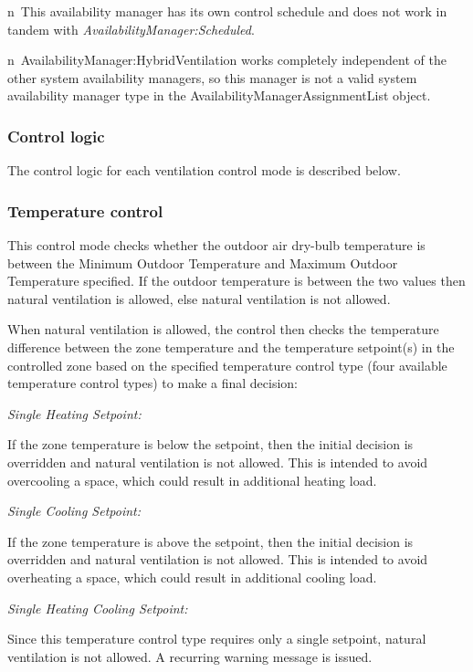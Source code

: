 n~This availability manager has its own control schedule and does not work in tandem with \emph{AvailabilityManager:Scheduled}.

n~AvailabilityManager:HybridVentilation works completely independent of the other system availability managers, so this manager is not a valid system availability manager type in the AvailabilityManagerAssignmentList object.

\subsubsection{Control logic}\label{control-logic-000}

The control logic for each ventilation control mode is described below.

\subsubsection{Temperature control}\label{temperature-control}

This control mode checks whether the outdoor air dry-bulb temperature is between the Minimum Outdoor Temperature and Maximum Outdoor Temperature specified. If the outdoor temperature is between the two values then natural ventilation is allowed, else natural ventilation is not allowed.

When natural ventilation is allowed, the control then checks the temperature difference between the zone temperature and the temperature setpoint(s) in the controlled zone based on the specified temperature control type (four available temperature control types) to make a final decision:

\emph{Single Heating Setpoint:}

If the zone temperature is below the setpoint, then the initial decision is overridden and natural ventilation is not allowed. This is intended to avoid overcooling a space, which could result in additional heating load.

\emph{Single Cooling Setpoint:}

If the zone temperature is above the setpoint, then the initial decision is overridden and natural ventilation is not allowed. This is intended to avoid overheating a space, which could result in additional cooling load.

\emph{Single Heating Cooling Setpoint:}

Since this temperature control type requires only a single setpoint, natural ventilation is not allowed. A recurring warning message is issued.

